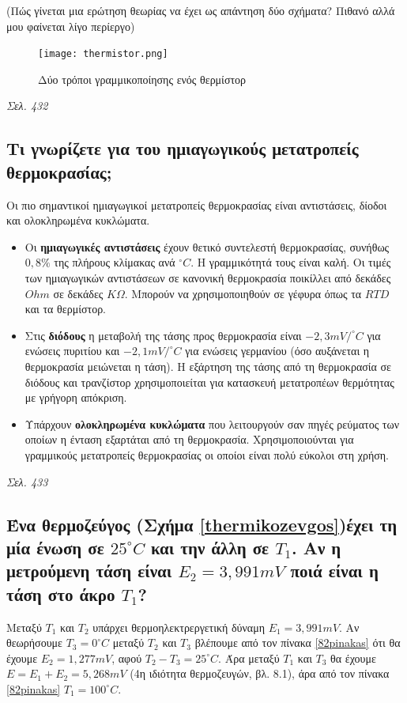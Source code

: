 \documentclass{article}
\begin{document}
(Πώς γίνεται μια ερώτηση θεωρίας να έχει ως απάντηση δύο σχήματα? Πιθανό αλλά μου φαίνεται λίγο περίεργο)

\begin{figure}[h!]
    \texttt{[image: thermistor.png]}
    \caption{Δύο τρόποι γραμμικοποίησης ενός θερμίστορ}
    \label{thermistor}
\end{figure}

\emph{Σελ. 432}

\subsection{Τι γνωρίζετε για του ημιαγωγικούς μετατροπείς θερμοκρασίας;}
Οι πιο σημαντικοί ημιαγωγικοί μετατροπείς θερμοκρασίας είναι αντιστάσεις, δίοδοι και ολοκληρωμένα κυκλώματα.

\begin{itemize}
    \item Οι \textbf{ημιαγωγικές αντιστάσεις} έχουν θετικό συντελεστή θερμοκρασίας, συνήθως $0,8\%$ της πλήρους κλίμακας ανά $^{\circ}C$. Η γραμμικότητά τους είναι καλή.
        Οι τιμές των ημιαγωγικών αντιστάσεων σε κανονική θερμοκρασία ποικίλλει από δεκάδες $Ohm$ σε δεκάδες $K\Omega$. Μπορούν να χρησιμοποιηθούν σε γέφυρα όπως τα
        $RTD$ και τα θερμίστορ.
    \item Στις \textbf{διόδους} η μεταβολή της τάσης προς θερμοκρασία είναι $-2,3mV/^{\circ}C$ για ενώσεις πυριτίου και $-2,1mV/^{\circ}C$ για ενώσεις γερμανίου (όσο 
        αυξάνεται η θερμοκρασία μειώνεται η τάση). Η εξάρτηση της τάσης από τη θερμοκρασία σε διόδους και τρανζίστορ χρησιμοποιείται για κατασκευή μετατροπέων θερμότητας
        με γρήγορη απόκριση.
    \item Υπάρχουν \textbf{ολοκληρωμένα κυκλώματα} που λειτουργούν σαν πηγές ρεύματος των οποίων η ένταση εξαρτάται από τη θερμοκρασία. Χρησιμοποιούνται για γραμμικούς
        μετατροπείς θερμοκρασίας οι οποίοι είναι πολύ εύκολοι στη χρήση.
\end{itemize}

\emph{Σελ. 433}

\subsection{Ένα θερμοζεύγος (Σχήμα \ref{thermikozevgos})έχει τη μία ένωση σε $25^{\circ} C$ και την άλλη σε $T_1$. Αν η μετρούμενη τάση είναι $E_2=3,991mV$ 
ποιά είναι η τάση στο άκρο $T_1$?}
Μεταξύ $T_1$ και $T_2$ υπάρχει θερμοηλεκτρεργετική δύναμη $E_1 = 3,991 mV$. Αν θεωρήσουμε $T_3 = 0^{\circ}C$ μεταξύ $T_2$ και $T_3$ βλέπουμε από τον πίνακα 
\ref{82pinakas} ότι θα έχουμε $E_2 = 1,277mV$, αφού $T_2 - T_3 = 25^{\circ}C$. Άρα μεταξύ $T_1$ και $T_3$ θα έχουμε $E = E_1 + E_2 = 5,268mV$ (4η ιδιότητα 
θερμοζευγών, βλ. 8.1), άρα από τον πίνακα \ref{82pinakas} $T_1 = 100^{\circ}C$.
\end{document}

